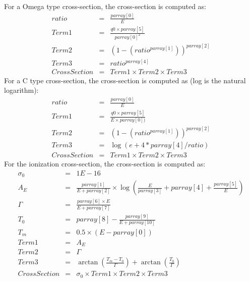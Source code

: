 For a Omega type cross-section, the cross-section is computed as:
\begin{eqnarray}
	ratio &=& \frac{parray[0]}{E} \\
	Term1 &=& \frac{q0 \times parray[5]}{parray[0]^2} \\
	Term2 &=& (1 - (ratio ^ {parray[1]})) ^{parray[2]}\\
	Term3 &=& ratio^{parray[4]}\\
	CrossSection &=& Term1 \times Term2 \times Term3
\end{eqnarray}
For a C type cross-section, the cross-section is computed as (log is the natural logarithm):
\begin{eqnarray}
	ratio &=& \frac{parray[0]}{E} \\
	Term1 &=& \frac{q0 \times parray[5]}{E \times parray[0])} \\
	Term2 &=& (1 - (ratio ^ {parray[1]})) ^{parray[2]}\\
	Term3 &=& \log( e + 4 * parray[4] / ratio)\\
	CrossSection &=& Term1 \times Term2 \times Term3
\end{eqnarray}
For the ionization cross-section, the cross-section is computed as:
\begin{eqnarray}
    \sigma_0 &=& 1E-16 \\
    A_E &=& \frac{parray[1]}{E + parray[2]} \times \log\left(\frac{E}{parray[3]} + parray[4] + \frac{parray[5]}{E}\right)\\
    \Gamma &=& \frac{parray[6] \times E}{E + parray[7]}\\
    T_0 &=& parray[8] - \frac{parray[9]}{E + parray[10]}\\
    T_m &=& 0.5 \times (E - parray[0])\\
    Term1 &=& A_E\\
    Term2 &=& \Gamma\\
    Term3 &=& \arctan\left(\frac{T_m-T_0}{\Gamma}\right) + \arctan\left(\frac{T_0}{\Gamma}\right)\\
    CrossSection &=& \sigma_0 \times Term1 \times Term2 \times Term3    
\end{eqnarray}

